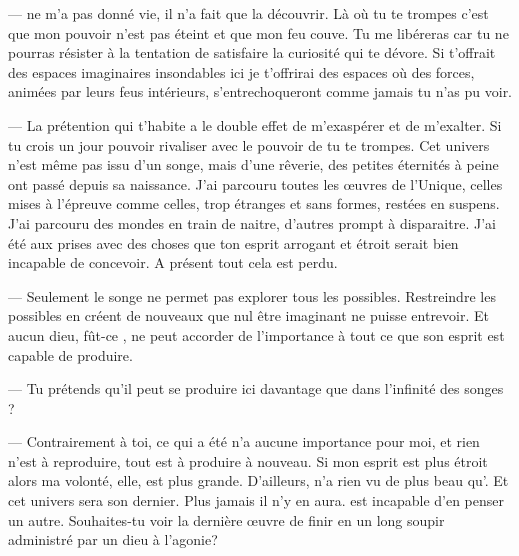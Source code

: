 --- \Mey ne m'a pas donné vie, il n'a fait que la découvrir. Là où tu te trompes c'est que mon pouvoir n'est pas éteint et que mon feu couve. Tu me libéreras car tu ne pourras résister à la tentation de satisfaire la curiosité qui te dévore. Si \Mey t'offrait des espaces imaginaires insondables ici je t'offrirai des espaces où des forces, animées par leurs feus intérieurs, s'entrechoqueront comme jamais tu n'as pu voir.

--- La prétention qui t'habite a le double effet de m'exaspérer et de m'exalter. Si tu crois un jour pouvoir rivaliser avec le pouvoir de \Mey tu te trompes. Cet univers n'est même pas issu d'un songe, mais d'une rêverie, des petites éternités à peine ont passé depuis sa naissance. J'ai parcouru toutes les œuvres de l'Unique, celles mises à l'épreuve comme celles, trop étranges et sans formes, restées en suspens. J'ai parcouru des mondes en train de naitre, d'autres prompt à disparaitre. J'ai été aux prises avec des choses que ton esprit arrogant et étroit serait bien incapable de concevoir. A présent tout cela est perdu.

--- Seulement le songe ne permet pas explorer tous les possibles. Restreindre les possibles en créent de nouveaux que nul être imaginant ne puisse entrevoir. Et aucun dieu, fût-ce \Mey, ne peut accorder de l'importance à tout ce que son esprit est capable de produire.

--- Tu prétends qu'il peut se produire ici davantage que dans l'infinité des songes ? 

--- Contrairement à toi, ce qui a été n'a aucune importance pour moi, et rien n'est à reproduire, tout est à produire à nouveau. Si mon esprit est plus étroit alors ma volonté, elle, est plus grande. D'ailleurs, \Mey n'a rien vu de plus beau qu'\Auga. Et cet univers sera son dernier. Plus jamais il n'y en aura. \Cind est incapable d'en penser un autre. Souhaites-tu voir la dernière œuvre de \Mey finir en un long soupir administré par un dieu à l'agonie?

